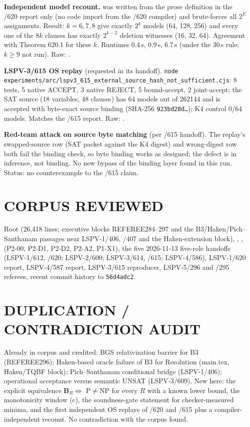 \documentclass[11pt]{article}
\begin{document}
\textbf{Independent model recount.}  was written from the prose definition in the /620 report only (no code import from the /620 compiler) and brute-forces all $2^{E}$ assignments. Result: $k=6,7,8$ give exactly $2^k$ models (64, 128, 256) and every one of the $8k$ clauses has exactly $2^{k-2}$ deletion witnesses (16, 32, 64). Agreement with Theorem 620.1 for these $k$. Runtimes 0.4\,s, 0.9\,s, 6.7\,s (under the 30\,s rule; $k\ge9$ not run). Raw: .

\textbf{LSPV-3/615 OS replay} (requested in its handoff). \texttt{node experiments/arc/lspv3\_615\_external\_source\_hash\_not\_sufficient.cjs}: 8 tests, 5 native ACCEPT, 3 native REJECT, 5 bound-accept, 2 joint-accept; the SAT source (18 variables, 48 clauses) has 64 models out of 262144 and is accepted with byte-exact source binding (SHA-256 \texttt{923bd28d\dots}); K4 control 0/64 models. Matches the /615 report. Raw: .

\textbf{Red-team attack on source byte matching} (per /615 handoff). The replay's swapped-source row (SAT packet against the K4 digest) and wrong-digest row both fail the binding check, so byte binding works as designed; the defect is in inference, not binding. No new bypass of the binding layer found in this run. Status: no counterexample to the /615 claim.

\section*{CORPUS REVIEWED}
Root  (26{,}418 lines; executive blocks REFEREE284--297 and the B3/Haken/Pich--Santhanam passages near LSPV-1/406, /407 and the Haken-extension block), , ,  (P2-00, P2-D1, P2-D2, P2-A2, P1-X1), the five 2026-11-13 five-role handoffs (LSPV-1/612, /620; LSPV-2/600; LSPV-3/614, /615; LSPV-4/586), LSPV-1/620 report, LSPV-4/587 report, LSPV-3/615 reproducer, LSPV-5/296 and /295 referees, recent commit history to \texttt{56d4adc2}.

\section*{DUPLICATION / CONTRADICTION AUDIT}
Already in corpus and credited: BGS relativization barrier for B3 (REFEREE296); Haken-based oracle failure of B3 for Resolution (main.tex, Haken/TQBF block); Pich--Santhanam conditional bridge (LSPV-1/406); operational acceptance versus semantic UNSAT (LSPV-3/609). New here: the explicit equivalence $\textbf{B}_R\Leftrightarrow$ P$\ne$NP for every $R$ with a known lower bound, the monotonicity window (c), the soundness-gate statement for checker-measured minima, and the first independent OS replays of /620 and /615 plus a compiler-independent recount. No contradiction with the corpus found.
\end{document}
